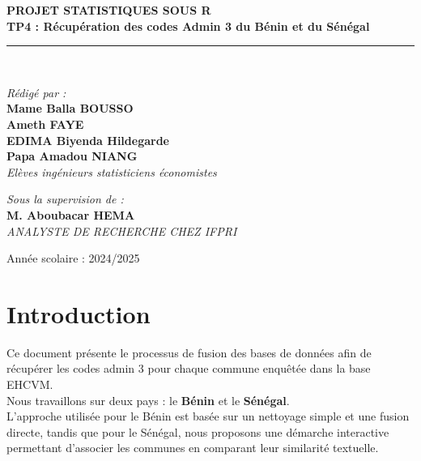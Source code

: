 \documentclass[
]{article}
\begin{document}
\begin{titlepage}
\begin{center}
        \textbf{\LARGE PROJET STATISTIQUES SOUS R }\\[0.3cm]
        \textbf{\Huge \color{black} \textsf{TP4 : Récupération des codes Admin 3 du Bénin et du Sénégal}}\\[0.2cm]
        \rule{\linewidth}{0.2mm} \\[0.5cm]
        
        \begin{minipage}{0.5\textwidth}
    \begin{flushleft} \large
        \emph{\textsf{Rédigé par :}}\\
        \textbf{Mame Balla BOUSSO}\\
        \textbf{Ameth FAYE}\\
        \textbf{EDIMA Biyenda Hildegarde}\\
        \textbf{Papa Amadou NIANG}\\
        \textit{Elèves ingénieurs statisticiens économistes}
    \end{flushleft}
\end{minipage}
        \hfill
        \begin{minipage}{0.4\textwidth}
            \begin{flushright} \large
                \emph{\textsf{Sous la supervision de :}} \\
                \textbf{M. Aboubacar HEMA}\\
                \textit{ANALYSTE DE RECHERCHE CHEZ IFPRI }
            \end{flushright}
        \end{minipage}

        \vfill

        {\large \textsf{Année scolaire : 2024/2025}}\\[0.5cm]
        
    \end{center}
\end{titlepage}

\hypertarget{introduction}{%
\section{Introduction}\label{introduction}}

Ce document présente le processus de fusion des bases de données afin de
récupérer les codes admin 3 pour chaque commune enquêtée dans la base
EHCVM.\\
Nous travaillons sur deux pays : le \textbf{Bénin} et le
\textbf{Sénégal}.\\
L'approche utilisée pour le Bénin est basée sur un nettoyage simple et
une fusion directe, tandis que pour le Sénégal, nous proposons une
démarche interactive permettant d'associer les communes en comparant
leur similarité textuelle.
\end{document}
